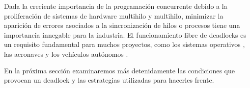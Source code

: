 Dada la creciente importancia de la programación concurrente debido a la proliferación de
sistemas de hardware multihilo y multihilo, minimizar la aparición de errores asociados a la
sincronización de hilos o procesos tiene una importancia innegable para la industria. El
funcionamiento libre de deadlocks es un requisito fundamental para muchos proyectos, como los
sistemas operativos \cite{ArpaciDusseau2018},
las aeronaves \cite{carreno2005safety,monzon2009deadlock}
y los vehículos autónomos \cite{Perronnet2019}.

En la próxima sección examinaremos más detenidamente las condiciones que provocan un
deadlock y las estrategias utilizadas para hacerles frente.
